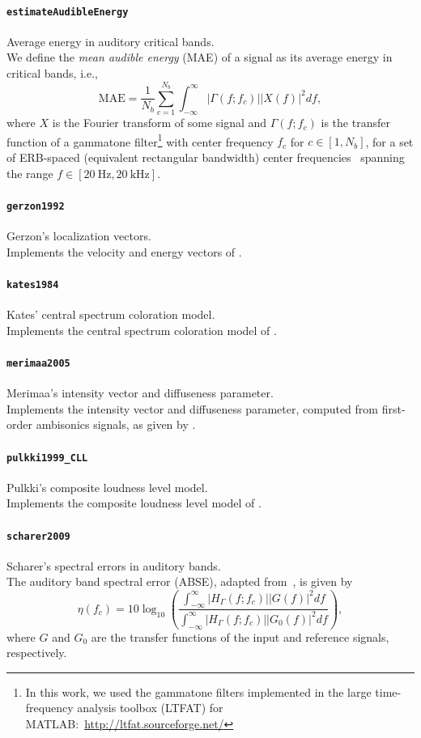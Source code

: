 \documentclass[11pt, oneside]{article}
\newcommand{\function}[1]{\paragraph*{\texttt{#1}}}
\begin{document}
\function{estimateAudibleEnergy} Average energy in auditory critical bands. \\
We define the \textit{mean audible energy} (MAE) of a signal as its average energy in critical bands, i.e.,
\begin{equation}\label{eq:estimateAudibleEnergy}
\text{MAE} = \frac{1}{N_b} \sum_{c = 1}^{N_b} \int_{-\infty}^\infty |\Gamma(f;f_c)| |X(f)|^2 df,
\end{equation}
where $X$ is the Fourier transform of some signal and $\Gamma(f;f_c)$ is the transfer function of a gammatone filter\footnote{In this work, we used the gammatone filters implemented in the large time-frequency analysis toolbox (LTFAT) for MATLAB:~\url{http://ltfat.sourceforge.net/}} with center frequency $f_c$ for $c \in [1, N_b]$, for a set of ERB-spaced (equivalent rectangular bandwidth) center frequencies~\citep{GlasbergMoore1990} spanning the range $f \in [20~\text{Hz}, 20~\text{kHz}]$.

\function{gerzon1992} Gerzon's localization vectors. \\
Implements the velocity and energy vectors of \citet{Gerzon1992}.

\function{kates1984} Kates' central spectrum coloration model. \\
Implements the central spectrum coloration model of \citet{Kates1984}.

\function{merimaa2005} Merimaa's intensity vector and diffuseness parameter. \\
Implements the intensity vector and diffuseness parameter, computed from first-order ambisonics signals, as given by \citet{MerimaaPulkki2005}.

\function{pulkki1999\_CLL} Pulkki's composite loudness level model. \\
Implements the composite loudness level model of \citet{Pulkki1999}.

\function{scharer2009} Scharer's spectral errors in auditory bands. \\
The auditory band spectral error (ABSE), adapted from~\citet[Eq.~(9)]{ScharerLindau2009}, is given by
\begin{equation}\label{eq:scharer2009}
\eta(f_c) = 10 \log_{10} \left( \frac{\displaystyle \int_{-\infty}^\infty |H_\Gamma(f;f_c)| |G(f)|^2 df}{\displaystyle \int_{-\infty}^\infty |H_\Gamma(f;f_c)| |G_0(f)|^2 df} \right),
\end{equation}
where $G$ and $G_0$ are the transfer functions of the input and reference signals, respectively.
\end{document}
